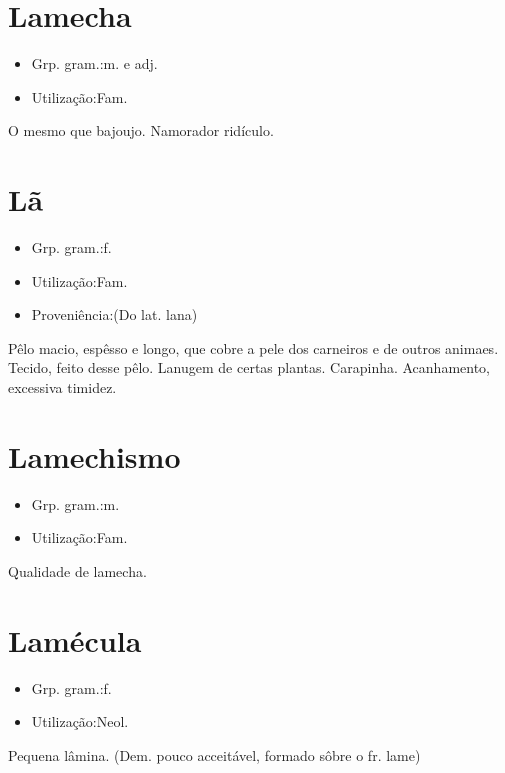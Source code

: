 \section{Lamecha}
\begin{itemize}
\item {Grp. gram.:m.  e  adj.}
\end{itemize}
\begin{itemize}
\item {Utilização:Fam.}
\end{itemize}
O mesmo que \textunderscore bajoujo\textunderscore .
Namorador ridículo.
\section{Lã}
\begin{itemize}
\item {Grp. gram.:f.}
\end{itemize}
\begin{itemize}
\item {Utilização:Fam.}
\end{itemize}
\begin{itemize}
\item {Proveniência:(Do lat. \textunderscore lana\textunderscore )}
\end{itemize}
Pêlo macio, espêsso e longo, que cobre a pele dos carneiros e de outros animaes.
Tecido, feito desse pêlo.
Lanugem de certas plantas.
Carapinha.
Acanhamento, excessiva timidez.
\section{Lamechismo}
\begin{itemize}
\item {Grp. gram.:m.}
\end{itemize}
\begin{itemize}
\item {Utilização:Fam.}
\end{itemize}
Qualidade de lamecha.
\section{Lamécula}
\begin{itemize}
\item {Grp. gram.:f.}
\end{itemize}
\begin{itemize}
\item {Utilização:Neol.}
\end{itemize}
Pequena lâmina.
(Dem. pouco acceitável, formado sôbre o fr. \textunderscore lame\textunderscore )
